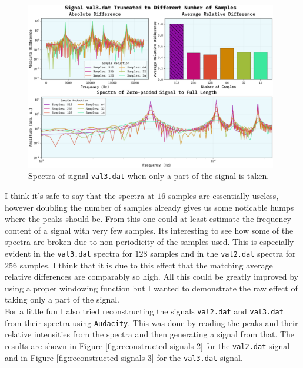 \documentclass[10pt, titlepage, a4paper]{article}
\begin{document}
\begin{figure}[H]
    \centering
    \includegraphics[width=0.98\textwidth]{../SpectralAnalysis/Images/reduced-samples-val3.dat.png}
    \caption{Spectra of signal \texttt{val3.dat} when only a part of the signal is taken.}
    \label{fig:partial-signal-3}
\end{figure}

I think it's safe to say that the spectra at $16$ samples are essentially useless, however doubling the number of samples 
already gives us some noticable humps where the peaks should be. From this one could at least estimate the frequency content 
of a signal with very few samples. Its interesting to see how some of the spectra are broken due to non-periodicity of the 
samples used. This is especially evident in the \texttt{val3.dat} spectra for $128$ samples and in the \texttt{val2.dat} 
spectra for $256$ samples. I think that it is due to this effect that the matching average relative differences are comparably
so high. All this could be greatly improved by using a proper windowing function but I wanted to demonstrate the raw effect 
of taking only a part of the signal. \\

For a little fun I also tried reconstructing the signals \texttt{val2.dat} and \texttt{val3.dat} from their spectra using 
\texttt{Audacity}. This was done by reading the peaks and their relative intensities from the spectra and then generating a
signal from that. The results are shown in Figure \ref{fig:reconstructed-signals-2} for the \texttt{val2.dat} signal and in
Figure \ref{fig:reconstructed-signals-3} for the \texttt{val3.dat} signal. 
\end{document}
